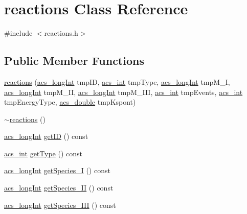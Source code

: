 \hypertarget{a00021}{\section{reactions Class Reference}
\label{a00021}
}


{\ttfamily \#include $<$reactions.\-h$>$}

\subsection*{Public Member Functions}
\begin{DoxyCompactItemize}
\item 
\hyperlink{a00021_a0b6ca1c86d79bb511f116d86714f74a6}{reactions} (\hyperlink{a00050_a19319d75f02db4308bc5c0026d98cd85}{acs\-\_\-long\-Int} tmp\-I\-D, \hyperlink{a00050_a8d277355641a098190360234e2ebde35}{acs\-\_\-int} tmp\-Type, \hyperlink{a00050_a19319d75f02db4308bc5c0026d98cd85}{acs\-\_\-long\-Int} tmp\-M\-\_\-\-I, \hyperlink{a00050_a19319d75f02db4308bc5c0026d98cd85}{acs\-\_\-long\-Int} tmp\-M\-\_\-\-I\-I, \hyperlink{a00050_a19319d75f02db4308bc5c0026d98cd85}{acs\-\_\-long\-Int} tmp\-M\-\_\-\-I\-I\-I, \hyperlink{a00050_a8d277355641a098190360234e2ebde35}{acs\-\_\-int} tmp\-Events, \hyperlink{a00050_a8d277355641a098190360234e2ebde35}{acs\-\_\-int} tmp\-Energy\-Type, \hyperlink{a00050_ab776853a005fcbf56af0424a2a4dd607}{acs\-\_\-double} tmp\-Kspont)
\item 
\hyperlink{a00021_ad0c79e56e87891c502d8fcd6c4005987}{$\sim$reactions} ()
\item 
\hyperlink{a00050_a19319d75f02db4308bc5c0026d98cd85}{acs\-\_\-long\-Int} \hyperlink{a00021_a5c30ce559254e67f7d4e219a8fe26fcc}{get\-I\-D} () const 
\item 
\hyperlink{a00050_a8d277355641a098190360234e2ebde35}{acs\-\_\-int} \hyperlink{a00021_ad928f8c901ad8e318e201cedcf1209ba}{get\-Type} () const 
\item 
\hyperlink{a00050_a19319d75f02db4308bc5c0026d98cd85}{acs\-\_\-long\-Int} \hyperlink{a00021_a90adbdb8288b8c67c7715949848583ab}{get\-Species\-\_\-\-I} () const 
\item 
\hyperlink{a00050_a19319d75f02db4308bc5c0026d98cd85}{acs\-\_\-long\-Int} \hyperlink{a00021_ac0bdd6d9081645bf3a2c5531a71cbe40}{get\-Species\-\_\-\-I\-I} () const 
\item 
\hyperlink{a00050_a19319d75f02db4308bc5c0026d98cd85}{acs\-\_\-long\-Int} \hyperlink{a00021_aaf426633019113ac4ae54cd5597920be}{get\-Species\-\_\-\-I\-I\-I} () const 
\item 

\end{DoxyCompactItemize}
